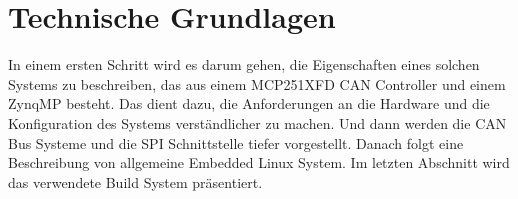 \chapter{Technische Grundlagen}
\label{cha:Technische_Grundlagen}

In einem ersten Schritt wird es darum gehen, die Eigenschaften eines solchen Systems zu beschreiben, das aus einem MCP251XFD CAN Controller und einem ZynqMP besteht. Das dient dazu, die Anforderungen an die Hardware und die Konfiguration des Systems verständlicher zu machen. Und dann werden die CAN Bus Systeme und die SPI Schnittstelle tiefer vorgestellt. Danach folgt eine Beschreibung von allgemeine Embedded Linux System. Im letzten Abschnitt wird das verwendete Build System präsentiert.